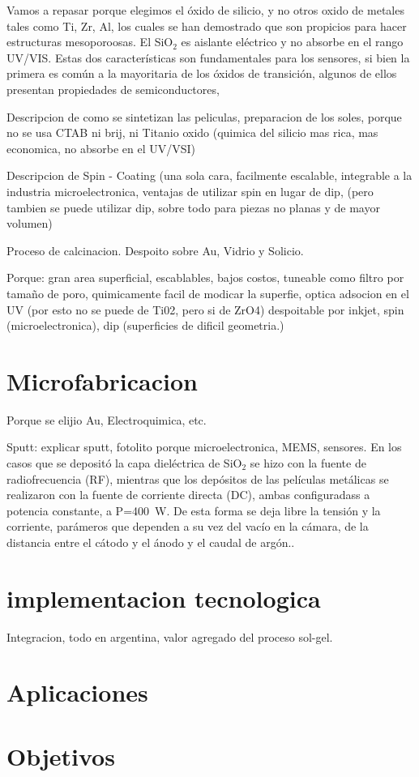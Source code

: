 				Vamos a repasar porque elegimos el óxido de silicio, y no otros oxido de metales tales como Ti, Zr, Al, los cuales se han demostrado que son propicios para hacer estructuras mesoporoosas. El SiO$_2$ es aislante eléctrico y no absorbe en el rango UV/VIS. Estas dos características son fundamentales para los sensores, si bien la primera es común a la mayoritaria de los óxidos de transición, algunos de ellos presentan propiedades de semiconductores, 

				Descripcion de como se sintetizan las peliculas, preparacion de los soles, porque no se usa CTAB ni brij, ni Titanio oxido (quimica del silicio mas rica, mas economica, no absorbe en el UV/VSI)

				Descripcion de Spin - Coating (una sola cara, facilmente escalable, integrable a la industria microelectronica, ventajas de utilizar spin en lugar de dip, (pero tambien se puede utilizar dip, sobre todo para piezas no planas y de mayor volumen)

				Proceso de calcinacion. Despoito sobre Au, Vidrio y Solicio.

				Porque: gran area superficial, escablables, bajos costos, tuneable como filtro por tamaño de poro, quimicamente facil de modicar la superfie, optica adsocion en el UV (por esto no se puede de Ti02, pero si de ZrO4) despoitable por inkjet, spin (microelectronica), dip (superficies de dificil geometria.)

\section{Microfabricacion}\label{sec:microfabricacion}

Porque se elijio Au, Electroquimica, etc.

Sputt: explicar sputt, fotolito porque microelectronica, MEMS, sensores.
En los casos que se depositó la capa dieléctrica de SiO$_2$ se hizo con la fuente de radiofrecuencia (RF), mientras que los depósitos de las películas metálicas se realizaron con la fuente de corriente directa (DC), ambas configuradass a potencia constante, a P=\SI{400}{\watt}.  De esta forma se deja libre la tensión y la corriente, parámeros que dependen a su vez del vacío en la cámara, de la distancia entre el cátodo y el ánodo y el caudal de argón.\cite{sigmund1968}. 

\section{implementacion tecnologica}

Integracion, todo en argentina, valor agregado del proceso sol-gel.

\section{Aplicaciones}

\section{Objetivos}